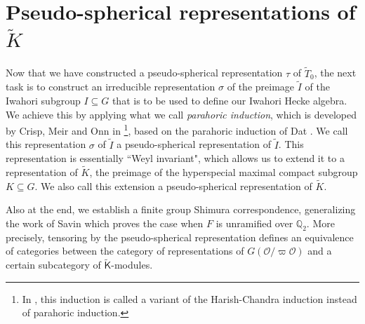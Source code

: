 \documentclass[10pt, letterpaper]{amsart}
\theoremstyle{plain}
\newtheorem{Prop}[equation]{Proposition}
\theoremstyle{definition}
\numberwithin{equation}{section}
\newcommand{\Q}{\mathbb{Q}}
\newcommand{\wt}{\tilde{w}}
\newcommand{\It}{\widetilde{I}}
\newcommand{\Kt}{\widetilde{K}}
\newcommand{\Tt}{\widetilde{T}}
\newcommand{\ttt}{\tilde{t}}
\newcommand{\Ocal}{\mathcal{O}}
\newcommand{\Wcal}{\mathcal{W}}
\newcommand{\Kf}{\mathsf{K}}
\begin{document}

\section{Pseudo-spherical representations of $\Kt$}\label{S:PSKType}


Now that we have constructed a pseudo-spherical representation $\tau$ of $\Tt_0$, the next task is to construct an irreducible representation $\sigma$ of the preimage $\It$ of the Iwahori subgroup $I\subseteq G$ that is to be used to define our Iwahori Hecke algebra. We achieve this by applying what we call {\it parahoric induction}, which is developed by Crisp, Meir and Onn in \cite{CMO19}\footnote{In \cite{CMO19}, this induction is called a variant of the Harish-Chandra induction instead of parahoric induction.}, based on the parahoric induction of Dat \cite{D09}. We call this representation $\sigma$ of $\It$ a pseudo-spherical representation of $\It$. This representation is essentially ``Weyl invariant", which allows us to extend it to a representation of $\Kt$, the preimage of the hyperspecial maximal compact subgroup $K\subseteq G$. We also call this extension a pseudo-spherical representation of $\Kt$.

Also at the end, we establish a finite group Shimura correspondence, generalizing the work of Savin \cite{S12} which proves the case when $F$ is unramified over $\Q_2$. More precisely, tensoring by the pseudo-spherical representation defines an equivalence of categories between the category of representations of $G(\Ocal/\varpi\Ocal)$ and a certain subcategory of $\widetilde{{\Kf}}$-modules. 
\end{document}
